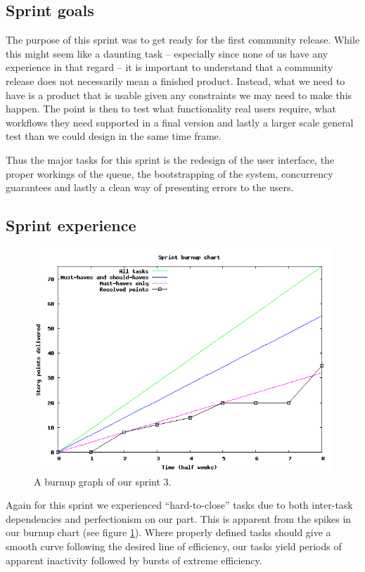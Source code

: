 \documentclass[a4paper,11pt]{article}
\begin{document}
\subsection{Sprint goals}
The purpose of this sprint was to get ready for the first community release.
While this might seem like a daunting task -- especially since none of us have
any experience in that regard -- it is important to understand that a community
release does not necessarily mean a finished product. Instead, what we need to
have is a product that is usable given any constraints we may need to make this
happen. The point is then to test what functionality real users require, what
workflows they need supported in a final version and lastly a larger scale general
test than we could design in the same time frame.

Thus the major tasks for this sprint is the redesign of the user interface, the
proper workings of the queue, the bootstrapping of the system, concurrency
guarantees and lastly a clean way of presenting errors to the users.

\subsection{Sprint experience}
\begin{figure}[!ht]
	\centering
	\includegraphics[width=\textwidth/4*3]{img/burndown.png}
	\caption{A burnup graph of our sprint 3.}
	\label{fig:burnup}
\end{figure}
Again for this sprint we experienced ``hard-to-close'' tasks due to both inter-task
dependencies and perfectionism on our part. This is apparent from the spikes in
our burnup chart (see figure \ref{fig:burnup}). Where properly defined tasks should give a
smooth curve following the desired line of efficiency, our tasks yield periods of
apparent inactivity followed by bursts of extreme efficiency.
\end{document}
